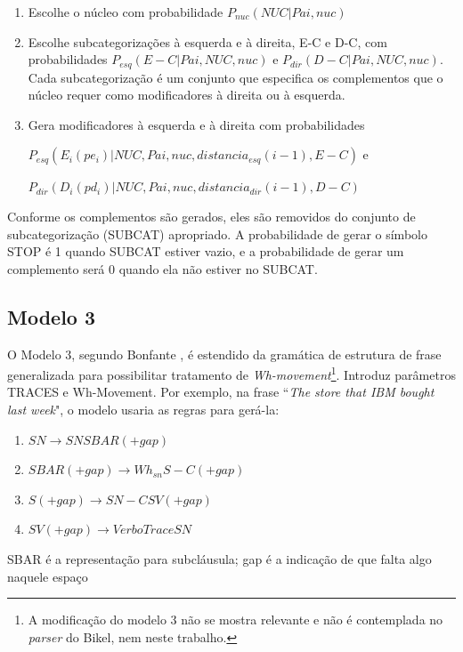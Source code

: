 \begin{enumerate}
  \item Escolhe o núcleo com probabilidade $P_{nuc}(NUC|Pai, nuc)$
  \item Escolhe subcategorizações à esquerda e à direita, E-C e D-C, com probabilidades $P_{esq}(E-C|Pai,NUC, nuc)$ e $P_{dir}(D-C|Pai,NUC, nuc)$. Cada subcategorização é um conjunto que especifica os complementos que o núcleo requer como modificadores à direita ou à esquerda.
  \item Gera modificadores à esquerda e à direita com probabilidades

$P_{esq}(E_i(pe_i)|NUC, Pai, nuc, distancia_{esq}(i - 1),E - C)$ e

$P_{dir}(D_i(pd_i)|NUC, Pai, nuc, distancia_{dir}(i - 1),D - C)$

\end{enumerate}

Conforme os complementos são gerados, eles são removidos do conjunto de subcategorização (SUBCAT) apropriado. A probabilidade de gerar o símbolo STOP é 1 quando SUBCAT estiver vazio, e a probabilidade de gerar um complemento será 0 quando ela não estiver no SUBCAT.

\subsection{Modelo 3}
\label{sub:modelo3}


O Modelo 3, segundo Bonfante \cite{bonfante03}, é estendido da gramática de estrutura de frase generalizada para possibilitar tratamento de \emph{Wh-movement}\footnote{A modificação do modelo 3 não se mostra relevante e não é contemplada no \emph{parser} do Bikel, nem neste trabalho.}. Introduz parâmetros TRACES e Wh-Movement. Por exemplo, na frase ``\emph{The store that IBM bought last week}", o modelo usaria as regras para gerá-la:

\begin{enumerate}
  \item $SN \rightarrow SN SBAR(+gap)$
  \item $SBAR(+gap) \rightarrow Wh_{sn} S-C(+gap)$
  \item $S(+gap) \rightarrow SN-C SV(+gap)$
  \item $SV(+gap) \rightarrow Verbo Trace SN$
\end{enumerate}


SBAR é a representação para subcláusula; gap é a indicação de que falta algo naquele espaço


